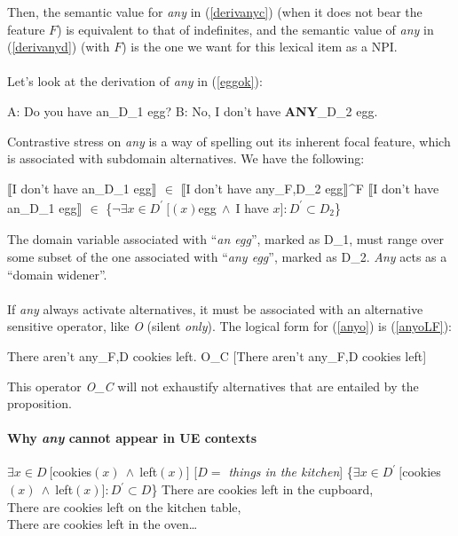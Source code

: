 \documentclass[a4paper,11pt]{article}
\newcommand{\reff}[1]{(\ref{#1})}
\newcommand{\eval}[2][]{$\llbracket$#2$\rrbracket_{#1}$}
\newcommand{\exs}[2][]{\begin{exe}\ex #1 \begin{xlist}#2\end{xlist}\end{exe}}
\begin{document}
Then, the semantic value for \emph{any} in \reff{derivanyc} (when it does not bear the feature $F$) is equivalent to that of indefinites, and the semantic value of \emph{any} in \reff{derivanyd} (with $F$) is the one we want for this lexical item as a NPI.

\paragraph{}
Let's look at the derivation of \emph{any} in \reff{eggok}:
\exs[\label{eggok}]{
	\ex A: Do you have an_{D_1} egg?
	\ex B: No, I don't have \textbf{ANY}_{D_2} egg.
}
%
Contrastive stress on \emph{any} is a way of spelling out its inherent focal feature, which is associated with subdomain alternatives. We have the following:

\exs[\label{eggokvalsem}]{
	\ex \eval{I don't have an_{D_1} egg} $\in$ \eval{I don't have any_{F,D_2} egg}^F
	\ex \eval{I don't have an_{D_1} egg} $\in$ \{$\neg \exists{x \in D^{\prime}}~[(x)$egg$~\wedge~$I have $x]: D^{\prime} \subset D_2$\} 
}
%
The domain variable associated with \enquote{\emph{an egg}}, marked as D_1, must range over some subset of the one associated with \enquote{\emph{any egg}}, marked as D_2. \emph{Any} acts as a \enquote{domain widener}.

\paragraph{}
If \emph{any} always activate alternatives, it must be associated with an alternative sensitive operator, like \emph{O} (silent \emph{only}). The logical form for \reff{anyo} is \reff{anyoLF}:

\exs{
	\ex\label{anyo} There aren't any_{F,D} cookies left.
	\ex\label{anyoLF} O_C [There aren't any_{F,D} cookies left]
}
%
This operator \emph{O_C} will not exhaustify alternatives that are entailed by the proposition.

\paragraph{Why \emph{any} cannot appear in UE contexts}
\exs{
	\label{anyue}
	\ex\label{anyuemeaning} $\exists{x \in D}~[$cookies$(x)~\wedge~$left$(x)]$ \hfill [\emph{$D =$ things in the kitchen}]	
	\ex\label{anyuealt} \{$\exists{x \in D^{\prime}}~[$cookies$(x)~\wedge~$left$(x)]: D^{\prime} \subset D$\}
	\ex\label{anyuealtexamples} There are cookies left in the cupboard,\\
		There are cookies left on the kitchen table,\\
		There are cookies left in the oven\ldots{}
}
\end{document}
